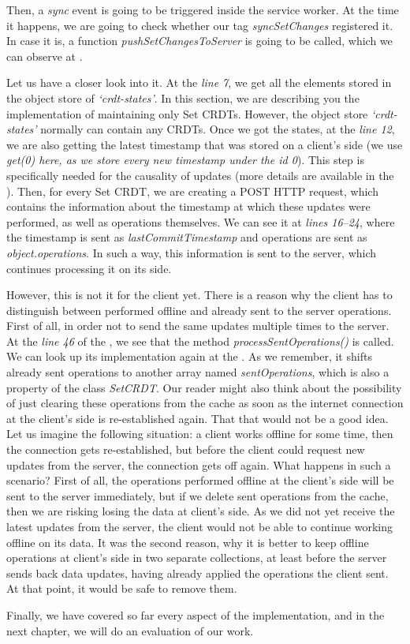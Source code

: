 Then, a \textit{sync} event is going to be triggered inside the service worker. At the time it happens, we are going to check whether our tag \textit{syncSetChanges} registered it. In case it is, a function \textit{pushSetChangesToServer} is going to be called, which we can observe at . 

Let us have a closer look into it. At the \textit{line 7}, we get all the elements stored in the object store of \textit{`crdt-states'}. In this section, we are describing you the implementation of maintaining only Set CRDTs. However, the object store \textit{`crdt-states'} normally can contain any CRDTs. Once we got the states, at the \textit{line 12}, we are also getting the latest timestamp that was stored on a client's side (we use \textit{get(0) here, as we store every new timestamp under the id \textit{0}}). This step is specifically needed for the causality of updates (more details are available in the ). Then, for every Set CRDT, we are creating a POST HTTP request, which contains the information about the timestamp at which these updates were performed, as well as operations themselves. We can see it at \textit{lines 16--24}, where the timestamp is sent as \textit{lastCommitTimestamp} and operations are sent as \textit{object.operations}. In such a way, this information is sent to the server, which continues processing it on its side.

However, this is not it for the client yet. There is a reason why the client has to distinguish between performed offline and already sent to the server operations. First of all, in order not to send the same updates multiple times to the server. At the \textit{line 46} of the , we see that the method \textit{processSentOperations()} is called. We can look up its implementation again at the . As we remember, it shifts already sent operations to another array named \textit{sentOperations}, which is also a property of the class \textit{SetCRDT}. Our reader might also think about the possibility of just clearing these operations from the cache as soon as the internet connection at the client's side is re-established again. That that would not be a good idea. Let us imagine the following situation: a client works offline for some time, then the connection gets re-established, but before the client could request new updates from the server, the connection gets off again. What happens in such a scenario? First of all, the operations performed offline at the client's side will be sent to the server immediately, but if we delete sent operations from the cache, then we are risking losing the data at client's side. As we did not yet receive the latest updates from the server, the client would not be able to continue working offline on its data. It was the second reason, why it is better to keep offline operations at client's side in two separate collections, at least before the server sends back data updates, having already applied the operations the client sent. At that point, it would be safe to remove them.

Finally, we have covered so far every aspect of the implementation, and in the next chapter, we will do an evaluation of our work.